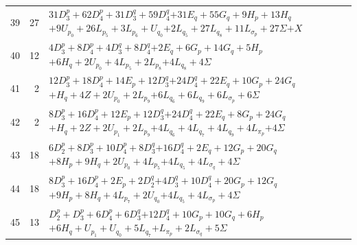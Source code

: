 \documentclass[11pt,a4paper]{article}
\theoremstyle{remark}
\begin{document}
\begin{longtable}{rrp{12.7cm}}
39&27&\( 31D_3^p + 62D_4^p + 31D_3^q + 59D_4^q \)\newline\( + 31E_q + 55G_q + 9H_p + 13H_q \)\newline\( + 9U_{p_{0}} + 26L_{p_{5}} + 3L_{p_{6}} + U_{q_{0}} \)\newline\( + 2L_{q_{5}} + 27L_{q_{8}} + 11L_{\sigma_p} + 27\Sigma \)\newline\( + X \)\\[3pt]
40&12&\( 4D_3^p + 8D_4^p + 4D_3^q + 8D_4^q \)\newline\( + 2E_q + 6G_p + 14G_q + 5H_p \)\newline\( + 6H_q + 2U_{p_{0}} + 4L_{p_{5}} + 2L_{p_{8}} \)\newline\( + 4L_{q_{8}} + 4\Sigma \)\\[3pt]
41&2&\( 12D_3^p + 18D_4^p + 14E_p + 12D_3^q \)\newline\( + 24D_4^q + 22E_q + 10G_p + 24G_q \)\newline\( + H_q + 4Z + 2U_{p_{0}} + 2L_{p_{9}} \)\newline\( + 6L_{q_{6}} + 6L_{q_{9}} + 6L_{\sigma_p} + 6\Sigma \)\\[3pt]
42&2&\( 8D_3^p + 16D_4^p + 12E_p + 12D_3^q \)\newline\( + 24D_4^q + 22E_q + 8G_p + 24G_q \)\newline\( + H_q + 2Z + 2U_{p_{1}} + 2L_{p_{9}} \)\newline\( + 4L_{q_{6}} + 4L_{q_{7}} + 4L_{q_{9}} + 4L_{\pi_p} \)\newline\( + 4\Sigma \)\\[3pt]
43&18&\( 6D_2^p + 8D_3^p + 10D_4^p + 8D_3^q \)\newline\( + 16D_4^q + 2E_q + 12G_p + 20G_q \)\newline\( + 8H_p + 9H_q + 2U_{p_{0}} + 4L_{p_{5}} \)\newline\( + 4L_{q_{5}} + 4L_{\sigma_q} + 4\Sigma \)\\[3pt]
44&18&\( 8D_3^p + 16D_4^p + 2E_p + 2D_2^q \)\newline\( + 4D_3^q + 10D_4^q + 20G_p + 12G_q \)\newline\( + 9H_p + 8H_q + 4L_{p_{7}} + 2U_{q_{0}} \)\newline\( + 4L_{q_{5}} + 4L_{\sigma_p} + 4\Sigma \)\\[3pt]
45&13&\( D_2^p + D_3^p + 6D_4^p + 6D_3^q \)\newline\( + 12D_4^q + 10G_p + 10G_q + 6H_p \)\newline\( + 6H_q + U_{p_{1}} + U_{q_{0}} + 5L_{q_{7}} \)\newline\( + L_{\pi_p} + 2L_{\sigma_q} + 5\Sigma \)\\[3pt]

\end{longtable}
\end{document}
